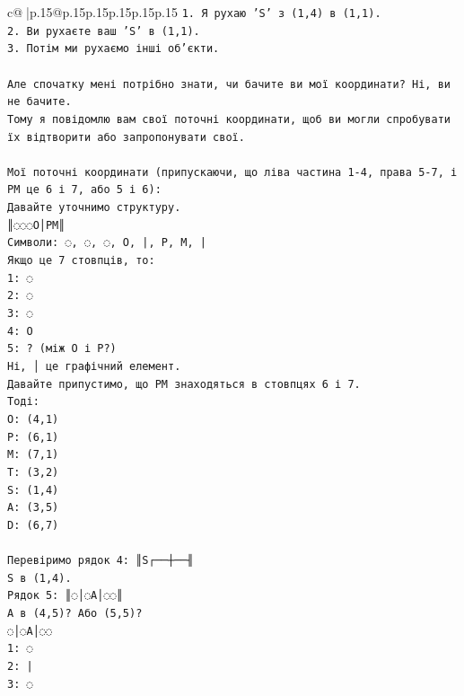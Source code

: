 \documentclass{article}
\begin{document}
{\begin{supertabular}{c@{$\;$}|p{.15\linewidth}@{}p{.15\linewidth}p{.15\linewidth}p{.15\linewidth}p{.15\linewidth}p{.15\linewidth}}
{{{\texttt{1. Я рухаю 'S' з (1,4) в (1,1).} \\
\texttt{2. Ви рухаєте ваш 'S' в (1,1).} \\
\texttt{3. Потім ми рухаємо інші об'єкти.} \\
\\ 
\texttt{Але спочатку мені потрібно знати, чи бачите ви мої координати? Ні, ви не бачите.} \\
\texttt{Тому я повідомлю вам свої поточні координати, щоб ви могли спробувати їх відтворити або запропонувати свої.} \\
\\ 
\texttt{Мої поточні координати (припускаючи, що ліва частина 1{-}4, права 5{-}7, і PM це 6 і 7, або 5 і 6):} \\
\texttt{Давайте уточнимо структуру.} \\
\texttt{║◌◌◌O│PM║} \\
\texttt{Символи: ◌, ◌, ◌, O, |, P, M, |} \\
\texttt{Якщо це 7 стовпців, то:} \\
\texttt{1: ◌} \\
\texttt{2: ◌} \\
\texttt{3: ◌} \\
\texttt{4: O} \\
\texttt{5: ? (між O і P?)} \\
\texttt{Ні, │ це графічний елемент.} \\
\texttt{Давайте припустимо, що PM знаходяться в стовпцях 6 і 7.} \\
\texttt{Тоді:} \\
\texttt{O: (4,1)} \\
\texttt{P: (6,1)} \\
\texttt{M: (7,1)} \\
\texttt{T: (3,2)} \\
\texttt{S: (1,4)} \\
\texttt{A: (3,5)} \\
\texttt{D: (6,7)} \\
\\ 
\texttt{Перевіримо рядок 4: ║S┌──┼──╢} \\
\texttt{S в (1,4).} \\
\texttt{Рядок 5: ║◌│◌A│◌◌║} \\
\texttt{A в (4,5)? Або (5,5)?} \\
\texttt{◌│◌A│◌◌} \\
\texttt{1: ◌} \\
\texttt{2: |} \\
\texttt{3: ◌} \\
}}}
\end{supertabular}}
\end{document}
